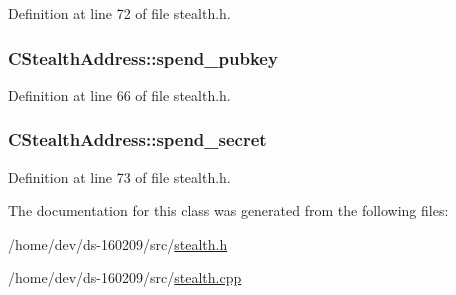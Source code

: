 Definition at line 72 of file stealth.\+h.

\hypertarget{class_c_stealth_address_ac66ac2e04abb7ee90555c702dfa3049c}{}
\subsubsection[{spend\+\_\+pubkey}]{ C\+Stealth\+Address\+::spend\+\_\+pubkey}\label{class_c_stealth_address_ac66ac2e04abb7ee90555c702dfa3049c}


Definition at line 66 of file stealth.\+h.

\hypertarget{class_c_stealth_address_a20697e3fc4e92648a190755cd44ee2ea}{}
\subsubsection[{spend\+\_\+secret}]{ C\+Stealth\+Address\+::spend\+\_\+secret}\label{class_c_stealth_address_a20697e3fc4e92648a190755cd44ee2ea}


Definition at line 73 of file stealth.\+h.



The documentation for this class was generated from the following files\+:\begin{DoxyCompactItemize}
\item 
/home/dev/ds-\/160209/src/\hyperlink{stealth_8h}{stealth.\+h}\item 
/home/dev/ds-\/160209/src/\hyperlink{stealth_8cpp}{stealth.\+cpp}\end{DoxyCompactItemize}
